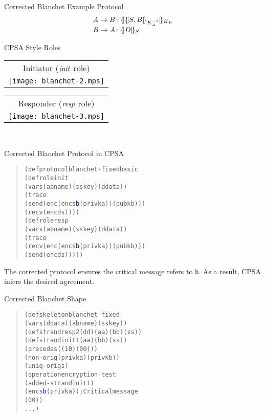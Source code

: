 \documentclass[landscape]{slides}
\newcommand{\cpsa}{CPSA}
\newcommand{\fn}[1]{\ensuremath{\mathop{\relax
                    \smash{\it#1}}\!\mathop{\vphantom{#1}}\nolimits}}
\newcommand{\enc}[2]{\{\!|#1|\!\}_{#2}}
\newcommand{\pubk}[1]{K_{#1}}
\newcommand{\privk}[1]{K^{-1}_{#1}}
\begin{document}
\begin{mitreslide}{Corrected Blanchet Example Protocol}
$$\begin{array}{r@{{}\colon{}}l}
A\to B&\enc{\enc{S,B}{\privk{A}}}{\pubk{B}}\\
B\to A&\enc{D}{S}
\end{array}$$
\begin{center}
CPSA Style Roles \\[2ex]
\begin{tabular}{c}
Initiator ($\fn{init}$ role)\\[2ex]
\texttt{[image: blanchet-2.mps]}
\end{tabular}\hfil
\begin{tabular}{c}
Responder ($\fn{resp}$ role)\\[2ex]
\texttt{[image: blanchet-3.mps]}
\end{tabular}\\[3ex]
\end{center}
\end{mitreslide}

\begin{mitreslide}{Corrected Blanchet Protocol in CPSA}
\begin{quote}
\begin{alltt}
(defprotocol blanchet-fixed basic
  (defrole init
    (vars (a b name) (s skey) (d data))
    (trace
     (send (enc (enc s \textcolor{blue}{b} (privk a)) (pubk b)))
     (recv (enc d s))))
  (defrole resp
    (vars (a b name) (s skey) (d data))
    (trace
     (recv (enc (enc s \textcolor{blue}{b} (privk a)) (pubk b)))
     (send (enc d s)))))
\end{alltt}
\end{quote}
\end{mitreslide}

\begin{note}
  The corrected protocol ensures the critical message refers to
  \texttt{b}.  As a result, {\cpsa} infers the desired agreement.
\end{note}

\begin{mitreslide}{Corrected Blanchet Shape}
\begin{quote}
\begin{alltt}
(defskeleton blanchet-fixed
  (vars (d data) (a b name) (s skey))
  (defstrand resp 2 (d d) (a a) (b b) (s s))
  (defstrand init 1 (a a) (b b) (s s))
  (precedes ((1 0) (0 0)))
  (non-orig (privk a) (privk b))
  (uniq-orig s)
  (operation encryption-test
    (added-strand init 1)
    (enc s \textcolor{blue}{b} (privk a))   ; Critical message
    (0 0))
  ...)
\end{alltt}
\end{quote}
\end{mitreslide}
\end{document}
